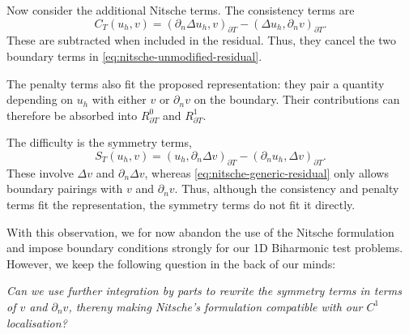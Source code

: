 \documentclass[11pt,a4paper]{article}
\begin{document}
Now consider the additional Nitsche terms. The consistency terms are
\begin{equation}
  C_T(u_h,v)
  = (\partial_n\Delta u_h,v)_{\partial T}
    - (\Delta u_h,\partial_n v)_{\partial T}.
  \label{eq:nitsche-consistency-terms}
\end{equation}
These are subtracted when
included in the residual. Thus, they cancel the two boundary terms in
\eqref{eq:nitsche-unmodified-residual}.

The penalty terms also fit the proposed representation: they pair a
quantity depending on $u_h$ with either $v$ or $\partial_n v$ on the
boundary. Their contributions can therefore be absorbed into
$R_{\partial T}^{0}$ and $R_{\partial T}^{1}$.

The difficulty is the symmetry terms,
\begin{equation}
  S_T(u_h,v)
  = (u_h,\partial_n\Delta v)_{\partial T}
    - (\partial_n u_h,\Delta v)_{\partial T}.
  \label{eq:nitsche-symmetry-terms}
\end{equation}
These involve $\Delta v$ and $\partial_n\Delta v$, whereas
\eqref{eq:nitsche-generic-residual} only allows boundary pairings with
$v$ and $\partial_n v$. Thus, although the consistency and penalty
terms fit the representation, the symmetry terms do not fit it directly.

With this observation, we for now abandon the use of the Nitsche formulation and impose boundary conditions strongly for our 1D Biharmonic test problems. However, we keep the following question in the back of our minds:

\medskip
\noindent\emph{Can we use further integration by parts to rewrite the
symmetry terms in terms of $v$ and $\partial_n v$, thereny making Nitsche's formulation compatible with our $C^1$ localisation?}





\end{document}
